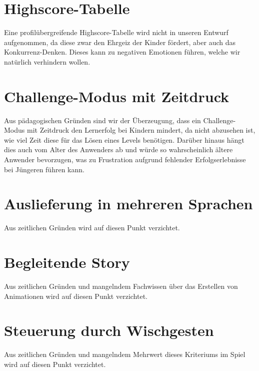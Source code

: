 \section{Highscore-Tabelle}

Eine profilübergreifende Highscore-Tabelle wird nicht in unseren Entwurf aufgenommen, da diese zwar den Ehrgeiz der Kinder fördert, aber auch das Konkurrenz-Denken. Dieses kann zu negativen Emotionen führen, welche wir natürlich verhindern wollen.

\section{Challenge-Modus mit Zeitdruck}

Aus pädagogischen Gründen sind wir der Überzeugung, dass ein Challenge-Modus mit Zeitdruck den Lernerfolg bei Kindern mindert, da nicht abzusehen ist, wie viel Zeit diese für das Lösen eines Levels benötigen. Darüber hinaus hängt dies auch vom Alter des Anwenders ab und würde so wahrscheinlich ältere Anwender bevorzugen, was zu Frustration aufgrund fehlender Erfolgserlebnisse bei Jüngeren führen kann.

\section{Auslieferung in mehreren Sprachen}

Aus zeitlichen Gründen wird auf diesen Punkt verzichtet.

\section{Begleitende Story}

Aus zeitlichen Gründen und mangelndem Fachwissen über das Erstellen von Animationen wird auf diesen Punkt verzichtet.

\section{Steuerung durch Wischgesten}

Aus zeitlichen Gründen und mangelndem Mehrwert dieses Kriteriums im Spiel wird auf diesen Punkt verzichtet.

